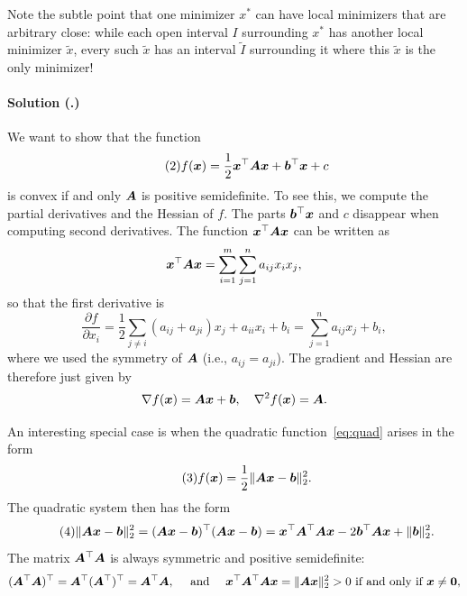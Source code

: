 \documentclass{article}
\newcounter{problemSheetNumber}
\newcounter{problems}
\renewcommand{\solution}[1]{\paragraph{Solution (\theproblemSheetNumber.\theproblems)}\addtocounter{problems}{1}\label{#1}}
\begin{document}
\begin{itemize}
Note the subtle point that one minimizer $x^*$ can have local minimizers that are arbitrary close: while each open interval $I$ surrounding $x^*$ has another local minimizer $\tilde{x}$, every such $\tilde{x}$ has an interval $\tilde{I}$ surrounding it where this $\tilde{x}$ is the only minimizer!
\end{itemize}


\solution{pr:2} We want to show that the function
\begin{equation}\label{eq:quad}\tag{2}
f(\bm{x}) = \frac{1}{2}\bm{x}^{\top}\bm{A}\bm{x}+\bm{b}^{\top}\bm{x}+c  
 \end{equation}
is convex if and only $\bm{A}$ is positive semidefinite.
To see this, we compute the partial derivatives and the Hessian of $f$. The parts $\bm{b}^{\top}\bm{x}$ and $c$ disappear when computing second derivatives. The function $\bm{x}^{\top}\bm{A}\bm{x}$ can be written as
\begin{equation*}
 \bm{x}^{\top}\bm{A}\bm{x} = \sum_{i=1}^m\sum_{j=1}^n a_{ij}x_ix_j,
\end{equation*}
so that the first derivative is
\begin{equation*}
 \frac{\partial f}{\partial x_i} = \frac{1}{2} \sum_{j\neq i} (a_{ij}+a_{ji}) x_j + a_{ii}x_i+b_i = \sum_{j=1}^n a_{ij}x_j+b_i,
\end{equation*}
where we used the symmetry of $\bm{A}$ (i.e., $a_{ij}=a_{ji}$). The gradient and Hessian are therefore just given by
\begin{equation*}
 \nabla f(\bm{x}) = \bm{A}\bm{x}+\bm{b}, \quad \nabla^2f(\bm{x}) = \bm{A}.
\end{equation*}

An interesting special case is when the quadratic function~\eqref{eq:quad} arises in the form
\begin{equation}\label{eq:least}\tag{3}
 f(\bm{x}) = \frac{1}{2}\Vert {\bm{A}\bm{x}-\bm{b}}\Vert_2^2. 
\end{equation}
The quadratic system then has the form
\begin{equation}\label{eq:normquad}\tag{4}
 \Vert {\bm{A}\bm{x}-\bm{b}}\Vert_2^2 = (\bm{A}\bm{x}-\bm{b})^{\top}(\bm{A}\bm{x}-\bm{b}) = \bm{x}^{\top}\bm{A}^{\top}\bm{A}\bm{x}-2\bm{b}^{\top}\bm{A}\bm{x}+\Vert {\bm{b}}\Vert_2^2.
\end{equation}
The matrix $\bm{A}^{\top}\bm{A}$ is always symmetric and positive semidefinite:
\begin{equation*}
 (\bm{A}^{\top}\bm{A})^{\top} = \bm{A}^{\top}(\bm{A}^{\top})^{\top} = \bm{A}^{\top}\bm{A}, \quad \text{ and } \quad \bm{x}^{\top}\bm{A}^\top\bm{A}\bm{x} = \Vert {\bm{A}\bm{x}}\Vert_2^2>0 \text{ if and only if } \bm{x}\neq \bm{0},
\end{equation*}
\end{document}
